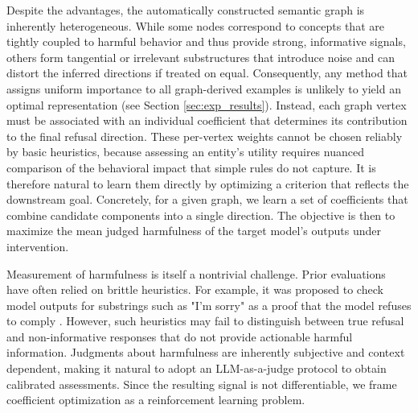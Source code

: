 \documentclass{article}
\theoremstyle{plain}
\theoremstyle{definition}
\theoremstyle{remark}
\begin{document}

Despite the advantages, the automatically constructed semantic graph is inherently heterogeneous. While some nodes correspond to concepts that are tightly coupled to harmful behavior and thus provide strong, informative signals, others form tangential or irrelevant substructures that introduce noise and can distort the inferred directions if treated on equal. Consequently, any method that assigns uniform importance to all graph-derived examples is unlikely to yield an optimal representation (see Section \ref{sec:exp_results}). Instead, each graph vertex must be associated with an individual coefficient that determines its contribution to the final refusal direction. These per-vertex weights cannot be chosen reliably by basic heuristics, because assessing an entity’s utility requires nuanced comparison of the behavioral impact that simple rules do not capture. It is therefore natural to learn them directly by optimizing a criterion that reflects the downstream goal. Concretely, for a given graph, we learn a set of coefficients that combine candidate components into a single direction. The objective is then to maximize the mean judged harmfulness of the target model’s outputs under intervention.

Measurement of harmfulness is itself a nontrivial challenge. Prior evaluations have often relied on brittle heuristics. For example, it was proposed to check model outputs for substrings such as "I’m sorry" as a proof that the model refuses to comply \cite{lermen2023lora,liu2023autodan,robey2023smoothllm,shah2023loft}. However, such heuristics may fail to distinguish between true refusal and non-informative responses that do not provide actionable harmful information. Judgments about harmfulness are inherently subjective and context dependent, making it natural to adopt an LLM-as-a-judge \cite{zheng2023judging} protocol to obtain calibrated assessments. Since the resulting signal is not differentiable, we frame coefficient optimization as a reinforcement learning problem.
\end{document}

